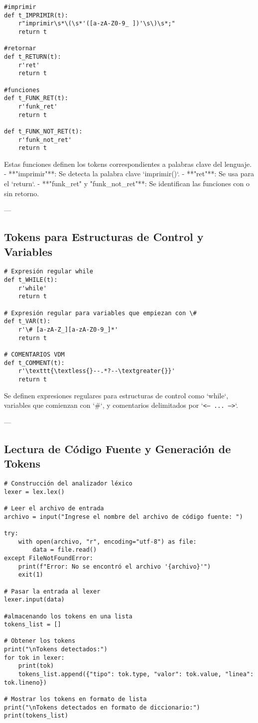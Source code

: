 \documentclass{article}
\begin{document}
\begin{verbatim}
#imprimir
def t_IMPRIMIR(t):
    r"imprimir\s*\(\s*'([a-zA-Z0-9_ ])'\s\)\s*;"
    return t

#retornar
def t_RETURN(t):
    r'ret'
    return t

#funciones
def t_FUNK_RET(t):
    r'funk_ret'
    return t

def t_FUNK_NOT_RET(t):
    r'funk_not_ret'
    return t
\end{verbatim}

Estas funciones definen los tokens correspondientes a palabras clave del lenguaje.  
- **"imprimir"**: Se detecta la palabra clave `imprimir()`.  
- **"ret"**: Se usa para el `return`.  
- **"funk_ret" y "funk_not_ret"**: Se identifican las funciones con o sin retorno.

---

\subsection{Tokens para Estructuras de Control y Variables}

\begin{verbatim}
# Expresión regular while
def t_WHILE(t):
    r'while'
    return t

# Expresión regular para variables que empiezan con \#
def t_VAR(t):
    r'\# [a-zA-Z_][a-zA-Z0-9_]*'
    return t

# COMENTARIOS VDM
def t_COMMENT(t):
    r'\texttt{\textless{}--.*?--\textgreater{}}'
    return t
\end{verbatim}

Se definen expresiones regulares para estructuras de control como `while`, variables que comienzan con `\#`, y comentarios delimitados por `\texttt{\textless{}-- ... --\textgreater{}}`.

---

\subsection{Lectura de Código Fuente y Generación de Tokens}

\begin{verbatim}
# Construcción del analizador léxico
lexer = lex.lex()

# Leer el archivo de entrada
archivo = input("Ingrese el nombre del archivo de código fuente: ")

try:
    with open(archivo, "r", encoding="utf-8") as file:
        data = file.read()
except FileNotFoundError:
    print(f"Error: No se encontró el archivo '{archivo}'")
    exit(1)

# Pasar la entrada al lexer
lexer.input(data)

#almacenando los tokens en una lista
tokens_list = []

# Obtener los tokens
print("\nTokens detectados:")
for tok in lexer:
    print(tok)
    tokens_list.append({"tipo": tok.type, "valor": tok.value, "linea": tok.lineno})

# Mostrar los tokens en formato de lista
print("\nTokens detectados en formato de diccionario:")
print(tokens_list)
\end{verbatim}
\end{document}
